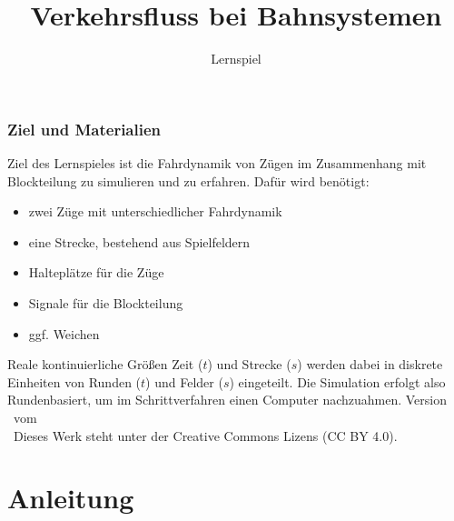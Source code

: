 \documentclass[
    nexus,      %
    10pt,        %
    oneside,
    draft=true,
    green,
]{tubsbook} %
\title{Verkehrsfluss bei Bahnsystemen}
\subtitle{Lernspiel}
\author{}
\date{}
\begin{document}
\maketitle[image,logo=right]

\section*{Ziel und Materialien}
  \noindent Ziel des Lernspieles ist die Fahrdynamik von Zügen im Zusammenhang mit Blockteilung zu simulieren und zu erfahren.
  Dafür wird benötigt:
  \begin{itemize}
    \item zwei Züge mit unterschiedlicher Fahrdynamik
    \item eine Strecke, bestehend aus Spielfeldern
    \item Halteplätze für die Züge
    \item Signale für die Blockteilung
    \item ggf. Weichen
  \end{itemize}
  Reale kontinuierliche Größen Zeit ($t$) und Strecke ($s$) werden dabei in diskrete Einheiten von Runden ($t$) und Felder ($s$) eingeteilt.
  Die Simulation erfolgt also Rundenbasiert, um im Schrittverfahren einen Computer nachzuahmen.
  \vfill
  {\noindent\large Version \vhCurrentVersion\ vom \vhCurrentDate } \\[0.5cm]
  \ccLogo \ccAttribution ~Dieses Werk steht unter der Creative Commons Lizens (CC BY 4.0).

\newpage
  \newcommand{\MS}{Martin Scheidt}
  \newcommand{\FN}{Felix Nebel}
  \newcommand{\LG}{Lukas Gruber}
  \begin{versionhistory}
  \end{versionhistory}
  \vhListAllAuthorsLongWithAbbrev
  \vfill
  \tableofcontents

\part{Anleitung}
\end{document}
